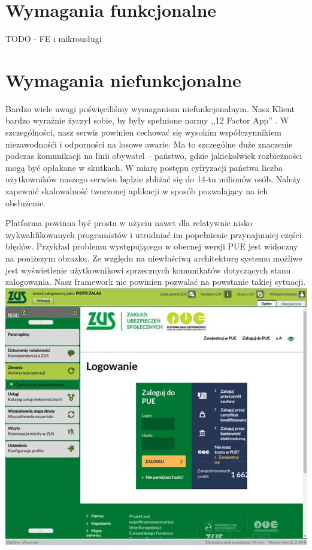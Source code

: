 \documentclass[licencjacka]{pracamgr}
\begin{document}
\section{Wymagania funkcjonalne}

TODO - FE i mikrousługi %

\section{Wymagania niefunkcjonalne}

Bardzo wiele uwagi poświęciliśmy wymaganiom niefunkcjonalnym. Nasz Klient bardzo
wyraźnie życzył sobie, by były spełnione normy ,,12 Factor App'' \cite{tfa}.
W szczególności, nasz serwis powinien cechować się wysokim współczynnikiem
niezawodnośći i odporności na losowe awarie. Ma to szczególne duże znaczenie
podczas komunikacji na linii obywatel -- państwo, gdzie jakiekolwiek rozbieżności
mogą być opłakane w skutkach. W miarę postępu cyfryzacji państwa liczba użytkowników
naszego serwisu będzie zbliżać się do 14-tu milionów osób. Należy zapewnić
skalowalność tworzonej aplikacji w sposób pozwalający na ich obsłużenie.

Platforma powinna być prosta w użyciu nawet dla relatywnie nisko wykwalifikowanych
programistów i utrudniać im popełnienie przynajmniej części błędów. Przykład
problemu występującego w obecnej wersji PUE jest widoczny na poniższym obrazku.
Ze względu na niewłaściwą architekturę systemu możliwe jest wyświetlenie
użytkownikowi sprzecznych komunikatów dotyczących stanu zalogowania. Nasz framework
nie powinien pozwalać na powstanie takiej sytuacji.\\
\includegraphics[width=\textwidth]{obrazki/logowaniezle.png}
\end{document}

